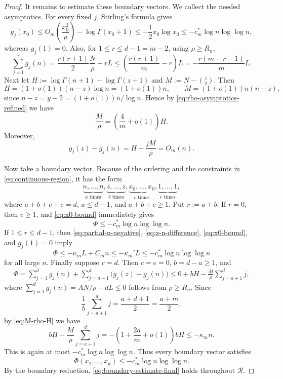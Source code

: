 \documentclass[11pt,reqno]{amsart}
\theoremstyle{definition}
\theoremstyle{remark}
\renewcommand\le{\leqslant}
\renewcommand\ge{\geqslant}
\begin{document}
\begin{proof}
It remains to estimate these boundary vectors. We collect the needed asymptotics. For every fixed $j$, Stirling's formula gives
\begin{equation}\label{eq:x0-bound}
        g_j(x_0)
        \le O_m\left(\frac{x_0^2}{\rho}\right)-\log\Gamma(x_0+1)
        \le -\frac12 x_0\log x_0
        \le -c_m^\ast\log n\log\log n,
\end{equation}
whereas $g_j(1)=0$. Also, for $1\le r\le d-1=m-2$, using $\rho\ge R_n$,
\begin{equation}\label{eq:partial-n-negative}
        \sum_{j=1}^r g_j(n)
        =\frac{r(r+1)}2\frac{N}{\rho}-rL
        \le \left(\frac{r(r+1)}m-r\right)L
        =-\frac{r(m-r-1)}mL .
\end{equation}
Next let $H:=\log\Gamma(n+1)-\log\Gamma(z+1)$ and $M:=N-\binom z2$. Then
\begin{equation}\label{eq:H-M-asymptotics}
        H=(1+o(1))(n-z)\log n=(1+o(1))n,
        \qquad
        M=(1+o(1))n(n-z),
\end{equation}
since $n-z=y-2=(1+o(1))n/\log n$. Hence by \eqref{eq:rho-asymptotics-refined} we have
\begin{equation}\label{eq:M-rho-H}
\frac M\rho=\left(\frac4m+o(1)\right)H.
\end{equation}
Moreover,
\begin{equation}\label{eq:z-n-difference}
        g_j(z)-g_j(n)=H-\frac{jM}{\rho}=O_m(n).
\end{equation}

Now take a boundary vector. Because of the ordering and the constraints in \eqref{eq:continuous-region}, it has the form
\[
        \underbrace{n,\ldots,n}_{a\text{ times}},
        \underbrace{z,\ldots,z}_{b\text{ times}},
        \underbrace{x_0,\ldots,x_0}_{c\text{ times}},
        \underbrace{1,\ldots,1}_{e\text{ times}},
\]
where $a+b+c+e=d$, $a\le d-1$, and $a+b+c\ge1$. Put $r:=a+b$. If $r=0$, then $c\ge1$, and \eqref{eq:x0-bound} immediately gives
\[
\Phi\le -c_m^\ast\log n\log\log n.
\]
If $1\le r\le d-1$, then \eqref{eq:partial-n-negative}, \eqref{eq:z-n-difference}, \eqref{eq:x0-bound}, and $g_j(1)=0$ imply
\[
        \Phi
        \le -\kappa_m L+C_m n
        \le -\kappa_m' L
        \le -c_m^\ast\log n\log\log n
\]
for all large $n$. Finally suppose $r=d$. Then $c=e=0$, $b=d-a\ge1$, and
\begin{align*}
\Phi=\sum_{j=1}^d g_j(n)+\sum_{j=a+1}^d\bigl(g_j(z)-g_j(n)\bigr)    \le 0+bH-\frac{M}{\rho}\sum_{j=a+1}^d j,
\end{align*}
where $\sum_{j=1}^d g_j(n)=AN/\rho-dL\le0$ follows from $\rho\ge R_n$. Since $$\frac1b\sum_{j=a+1}^d j=\frac{a+d+1}{2}=\frac{a+m}{2},$$
by \eqref{eq:M-rho-H} we have
\[
bH-\frac{M}{\rho}\sum_{j=a+1}^d j
=-\left(1+\frac{2a}{m}+o(1)\right)bH
\le -\kappa_m n.
\]
This is again at most $-c_m^\ast\log n\log\log n$. Thus every boundary vector satisfies
\begin{equation}\label{eq:boundary-estimate-final}
        \Phi(x_1,\ldots,x_d)
        \le -c_m^\ast\log n\log\log n .
\end{equation}
By the boundary reduction, \eqref{eq:boundary-estimate-final} holds throughout $\mathcal R$.


\end{proof}
\end{document}
